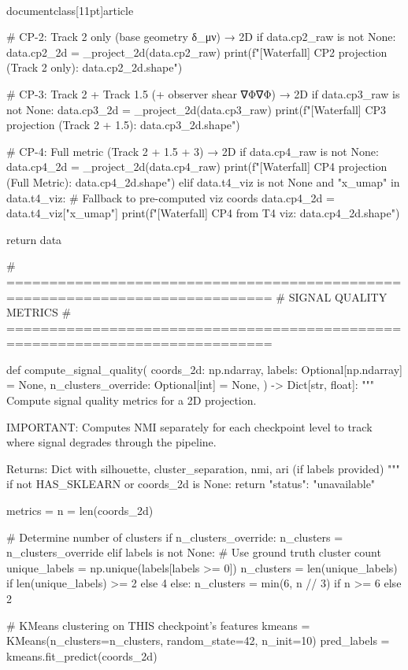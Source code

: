 \\documentclass[11pt]{article}
\begin{document}
\begin{CodeBlock}
    # CP-2: Track 2 only (base geometry δ_μν) → 2D
    if data.cp2_raw is not None:
        data.cp2_2d = _project_2d(data.cp2_raw)
        print(f"[Waterfall] CP2 projection (Track 2 only): {data.cp2_2d.shape}")

    # CP-3: Track 2 + Track 1.5 (+ observer shear ∇Φ∇Φ) → 2D
    if data.cp3_raw is not None:
        data.cp3_2d = _project_2d(data.cp3_raw)
        print(f"[Waterfall] CP3 projection (Track 2 + 1.5): {data.cp3_2d.shape}")

    # CP-4: Full metric (Track 2 + 1.5 + 3) → 2D
    if data.cp4_raw is not None:
        data.cp4_2d = _project_2d(data.cp4_raw)
        print(f"[Waterfall] CP4 projection (Full Metric): {data.cp4_2d.shape}")
    elif data.t4_viz is not None and "x_umap" in data.t4_viz:
        # Fallback to pre-computed viz coords
        data.cp4_2d = data.t4_viz["x_umap"]
        print(f"[Waterfall] CP4 from T4 viz: {data.cp4_2d.shape}")

    return data


# =============================================================================
# SIGNAL QUALITY METRICS
# =============================================================================

def compute_signal_quality(
    coords_2d: np.ndarray,
    labels: Optional[np.ndarray] = None,
    n_clusters_override: Optional[int] = None,
) -> Dict[str, float]:
    """
    Compute signal quality metrics for a 2D projection.

    IMPORTANT: Computes NMI separately for each checkpoint level to track
    where signal degrades through the pipeline.

    Returns:
        Dict with silhouette, cluster_separation, nmi, ari (if labels provided)
    """
    if not HAS_SKLEARN or coords_2d is None:
        return {"status": "unavailable"}

    metrics = {}
    n = len(coords_2d)

    # Determine number of clusters
    if n_clusters_override:
        n_clusters = n_clusters_override
    elif labels is not None:
        # Use ground truth cluster count
        unique_labels = np.unique(labels[labels >= 0])
        n_clusters = len(unique_labels) if len(unique_labels) >= 2 else 4
    else:
        n_clusters = min(6, n // 3) if n >= 6 else 2

    # KMeans clustering on THIS checkpoint's features
    kmeans = KMeans(n_clusters=n_clusters, random_state=42, n_init=10)
    pred_labels = kmeans.fit_predict(coords_2d)


\end{CodeBlock}
\end{document}
